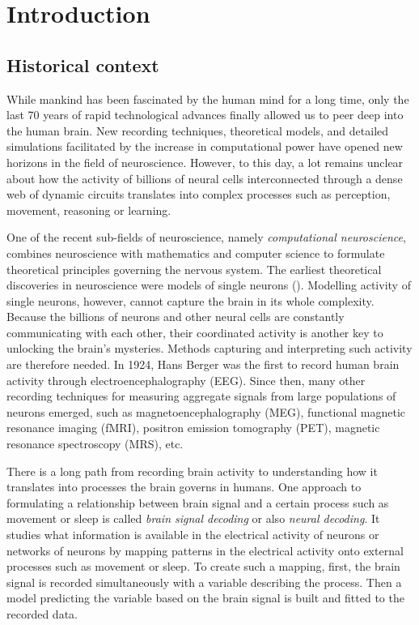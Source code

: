 
\chapter{Introduction}
\label{chap:intr}

\section*{Historical context}
While mankind has been fascinated by the human mind for a long time, only the last 70 years of rapid technological advances finally allowed us to peer deep into the human brain.
New recording techniques, theoretical models, and detailed simulations facilitated by the increase in computational power have opened new horizons in the field of neuroscience.
However, to this day, a lot remains unclear about how the activity of billions of neural cells interconnected through a dense web of dynamic circuits translates into complex processes such as perception, movement, reasoning or learning.  

One of the recent sub-fields of neuroscience, namely \textit{computational neuroscience}, combines neuroscience with mathematics and computer science to formulate theoretical principles governing the nervous system. 
The earliest theoretical discoveries in neuroscience were models of single neurons (\cite{lapique-1907, hodgkin1952quantitative}).
Modelling activity of single neurons, however, cannot capture the brain in its whole complexity.
Because the billions of neurons and other neural cells are constantly communicating with each other, their coordinated activity is another key to unlocking the brain's mysteries.
Methods capturing and interpreting such activity are therefore needed.
In 1924, Hans Berger was the first to record human brain activity through electroencephalography (EEG).
Since then, many other recording techniques for measuring aggregate signals from large populations of neurons emerged, such as magnetoencephalography (MEG), functional magnetic resonance imaging (fMRI), positron emission tomography (PET), magnetic resonance spectroscopy (MRS), etc.  

There is a long path from recording brain activity to understanding how it translates into processes the brain governs in humans.
One approach to formulating a relationship between brain signal and a certain process such as movement or sleep is called \textit{brain signal decoding} or also \textit{neural decoding}.
It studies what information is available in the electrical activity of neurons or networks of neurons by mapping patterns in the electrical activity onto external processes such as movement or sleep.
To create such a mapping, first, the brain signal is recorded simultaneously with a variable describing the process. 
Then a model predicting the variable based on the brain signal is built and fitted to the recorded data.

